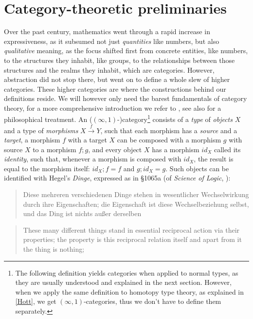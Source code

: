 \documentclass{article}
\begin{document}
\section{Category-theoretic preliminaries}
Over the past century, mathematics went through a rapid increase in expressiveness, as it subsumed not
just \emph{quantities} like numbers, but also \emph{qualitative} meaning, as the focus shifted first from
concrete entities, like numbers, to the structures they inhabit, like groups, to the relationships between
those structures and the realms they inhabit, which are categories. However, abstraction did not stop
there, but went on to define a whole slew of higher categories. These higher categories are where the
constructions behind our definitions reside. We will however only need the barest fundamentals of category
theory, for a more comprehensive introduction we refer to \cite{Lein}, see also \cite{CPhil} for a 
philosophical treatment. An ($(\infty, 1)$-)category\footnote{The following definition yields categories
when applied to normal types, as they are usually understood and explained in the next section. However, when we apply
the same definition to homotopy type theory, as explained in \ref{Hott}, we get $(\infty,1)$-categories,
thus we don't have to define them separately.} consists of a \emph{type} of \emph{objects} $X$ and a type
of \emph{morphisms} $X\xrightarrow{f} Y$, such that each morphism has a \emph{source} and a \emph{target},
a morphism $f$ with a target $X$ can be composed with a morphism $g$ with source $X$ to a morphism $f;g$,
and every object $X$ has a morphism $id_X$ called its \emph{identity}, such that, whenever a morphism
is composed with $id_X$, the result is equal to the morphism itself: $id_X;f=f$ and $g;id_X=g$. Such objects
can be identified with Hegel's \emph{Dinge}, expressed as in §1065a (of \emph{Science of Logic}, \cite{Sol}):


\begin{quote}
    Diese mehreren verschiedenen Dinge stehen in wesentlicher Wechselwirkung durch ihre Eigenschaften;
die Eigenschaft ist diese Wechselbeziehung selbst, und das Ding ist nichts außer derselben
\end{quote}

\begin{quote}
    These many different things stand in essential reciprocal action via their properties; the property
is this reciprocal relation itself and apart from it the thing is nothing;
\end{quote}
\end{document}
